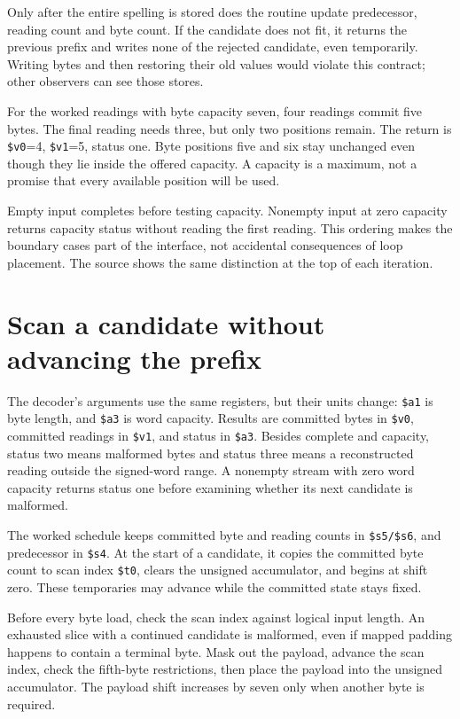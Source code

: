 Only after the entire spelling is stored does the routine update predecessor,
reading count and byte count. If the candidate does not fit, it returns the
previous prefix and writes none of the rejected candidate, even temporarily.
Writing bytes and then restoring their old values would violate this contract;
other observers can see those stores.

For the worked readings with byte capacity seven, four readings commit five
bytes. The final reading needs three, but only two positions remain. The return
is \texttt{\$v0}=4, \texttt{\$v1}=5, status one. Byte positions five and six
stay unchanged even though they lie inside the offered capacity. A capacity is
a maximum, not a promise that every available position will be used.

Empty input completes before testing capacity. Nonempty input at zero capacity
returns capacity status without reading the first reading. This ordering makes
the boundary cases part of the interface, not accidental consequences of loop
placement. The source shows the same distinction at the top of each iteration.

\section{Scan a candidate without advancing the prefix}

The decoder's arguments use the same registers, but their units change:
\texttt{\$a1} is byte length, and \texttt{\$a3} is word capacity. Results are
committed bytes in \texttt{\$v0}, committed readings in \texttt{\$v1}, and
status in \texttt{\$a3}. Besides complete and capacity, status two means
malformed bytes and status three means a reconstructed reading outside the
signed-word range. A nonempty stream with zero word capacity returns status one
before examining whether its next candidate is malformed.

The worked schedule keeps committed byte and reading counts in
\texttt{\$s5/\$s6}, and predecessor in \texttt{\$s4}. At the start of a
candidate, it copies the committed byte count to scan index \texttt{\$t0},
clears the unsigned accumulator, and begins at shift zero. These temporaries
may advance while the committed state stays fixed.

Before every byte load, check the scan index against logical input length.
An exhausted slice with a continued candidate is malformed, even if mapped
padding happens to contain a terminal byte. Mask out the payload, advance the
scan index, check the fifth-byte restrictions, then place the payload into the
unsigned accumulator. The payload shift increases by seven only when another
byte is required.

